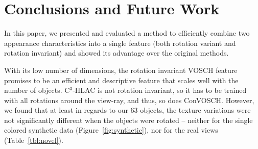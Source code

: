 \documentclass[a4paper, 10 pt, conference]{sty/ieeeconf}
\begin{document}






\section{Conclusions and Future Work}
\label{sec:conclusion}

In this paper, we presented and evaluated a method to efficiently combine two
appearance characteristics into a single feature (both rotation
variant and rotation invariant) and showed its advantage over
the original methods.

With its low number of dimensions, the rotation invariant VOSCH feature
promises to be an efficient and descriptive feature that scales well with
the number of objects.
C$^3$-HLAC is not rotation invariant, so it has to be trained with
all rotations around the view-ray, and thus, so does ConVOSCH.
However, we found that at least in regards to our 63 objects, the texture variations
were not significantly different when the objects were rotated
-- neither for the single colored synthetic data (Figure~\ref{fig:synthetic}),
nor for the real views (Table~\ref{tbl:novel}).
\end{document}
